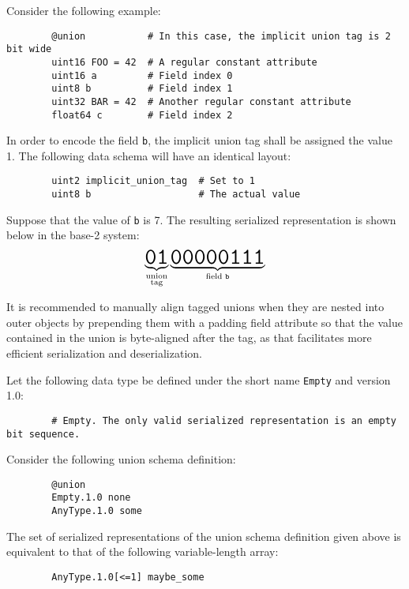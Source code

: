 \begin{remark}
    Consider the following example:

    \begin{verbatim}
        @union           # In this case, the implicit union tag is 2 bit wide
        uint16 FOO = 42  # A regular constant attribute
        uint16 a         # Field index 0
        uint8 b          # Field index 1
        uint32 BAR = 42  # Another regular constant attribute
        float64 c        # Field index 2
    \end{verbatim}

    In order to encode the field \verb|b|, the implicit union tag shall be assigned the value 1.
    The following data schema will have an identical layout:

    \begin{verbatim}
        uint2 implicit_union_tag  # Set to 1
        uint8 b                   # The actual value
    \end{verbatim}

    Suppose that the value of \verb|b| is 7.
    The resulting serialized representation is shown below in the base-2 system:
    $$%
    \underbrace{\hugett{01}}_{\substack{\text{union} \\ \text{tag}}}%
    \underbrace{\hugett{00000111}}_{\text{field }\texttt{b}}%
    $$

    It is recommended to manually align tagged unions when they are nested into outer objects by
    prepending them with a padding field attribute so that the value contained in the union is byte-aligned
    after the tag, as that facilitates more efficient serialization and deserialization.
\end{remark}

\begin{remark}
    Let the following data type be defined under the short name \verb|Empty| and version 1.0:

    \begin{verbatim}
        # Empty. The only valid serialized representation is an empty bit sequence.
    \end{verbatim}

    Consider the following union schema definition:

    \begin{verbatim}
        @union
        Empty.1.0 none
        AnyType.1.0 some
    \end{verbatim}

    The set of serialized representations of the union schema definition given above is equivalent to
    that of the following variable-length array:

    \begin{verbatim}
        AnyType.1.0[<=1] maybe_some
    \end{verbatim}
\end{remark}


